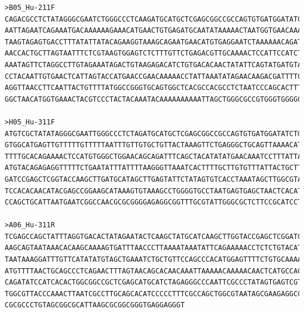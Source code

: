 \begin{verbatim}
>B05_Hu-211F
CAGACGCCTCTATAGGGCGAATCTGGGCCCTCAAGATGCATGCTCGAGCGGCCGCCAGTGTGATGGATATCTGCAGAATTCGCCCTTCAGTGAACGCCAAACAAGTAAGATTAGAATTAC
AATTAGAATCAGAAATGACAAAAAAGAAACATGAACTGTGAGATGCAATATAAAAACTAATGGTGAACAAAGCAAAGAATAAAAAATAAAAACGGAAAGATTAAAAGGAAAATGTGACTG
TAAGTAGAGTGACCTTTATATTATACAGAAGGTAAAGCAGAATGAACATGTGAGGAATCTAAAAAACAGATATAAAATAGAAACAACTGAAGGCTTATATAATTAGTCTATAAAGCTAGG
AACCACTGCTTAGTAATTTCTCGTAAGTGGAGTCTCTTTGTTCTGAGACGTTGCAAAACTCCATTCCATCTCAAAGTTATTTTTAATGTTAAAATTTGTAAGAGTGAGCAACGGTATCCT
AAATAGTTCTAGGCCTTGTAGAAATAGACTGTAAGAGACATCTGTGACACAACTATATTCAGTATGATGTAGGGTCTGTTACAATGGGATGAAGTGAATTTAGATTATTTCAAGACTAAA
CCTACAATTGTGAACTCATTAGTACCATGAACCGAACAAAAACCTATTAAATATAGAACAAGACGATTTTCATGAAAAAATAAATATGAACAAATCAGTATTTTCAGTTGTTTGAAATAT
AGGTTAACCTTCAATTACTGTTTTATGGCCGGGTGCAGTGGCTCACGCCACGCCTCTAATCCCAGCACTTTGGGAGGCCGAGGCAGGCGGATCATGAGGTCAGGAGATCGAGACCATCCT
GGCTAACATGGTGAAACTACGTCCCTACTACAAATACAAAAAAAAAATTAGCTGGGCGCCGTGGGTGGGGCGCCTATAGTCCCAAGCT

>H05_Hu-311F
ATGTCGCTATATAGGGCGAATTGGGCCCTCTAGATGCATGCTCGAGCGGCCGCCAGTGTGATGGATATCTGCAGAATTCGCCCTTGGCCACGCGTCGACTAGTACTTTTTTTTTTCTTTT
GTGGCATGAGTTGTTTTTGTTTTTAATTTGTTGTGCTGTTACTAAAGTTCTGAGGGCTGCAGTTAAAACATTCCAATTTCTCCCTTCCTTCCATCTTTCTTTATTGATTGATTCTCAAGA
TTTTGCACAGAAAACTCCATGTGGGCTGGAACAGCAGATTTCAGCTACATATATGAACAAATCCTTTATTATTATTATAATTATTTTTTGCGTGAAAGTGTTACATATTCTTTCACTTGT
ATGTACAGAGAGGTTTTTCTGAATATTTATTTTAAGGGTTAAATCACTTTTGCTTGTGTTTATTACTGCTTGAGGTTGAGCCAAGGGCGAATTCCAGCACACTGGCGGCCGTTACTAGTG
GATCCGAGCTCGGTACCAAGCTTGATGCATAGCTTGAGTATTCTATAGTGTCACCTAAATAGCTTGGCGTAATCATGGTCATAGCTGTTTCCTGTGTGAAATTGTTATCCGCTCACAAAT
TCCACACAACATACGAGCCGGAAGCATAAAGTGTAAAGCCTGGGGTGCCTAATGAGTGAGCTAACTCACATTAATTGCGTTGCGCTCACTGCCCGCTTTCCAGTCGGGAAACCTGTCGTG
CCAGCTGCATTAATGAATCGGCCAACGCGCGGGGAGAGGCGGTTTGCGTATTGGGCGCTCTTCCGCATCCTCGCTC

>A06_Hu-311R
TCGAGCCAGCTATTTAGGTGACACTATAGAATACTCAAGCTATGCATCAAGCTTGGTACCGAGCTCGGATCCACTAGTAACGGCCGCCAGTGTGCTGGAATTCGCCCTTGGCTCAACCTC
AAGCAGTAATAAACACAAGCAAAAGTGATTTAACCCTTAAAATAAATATTCAGAAAAACCTCTCTGTACATACAAGTGAAAGAATATGTAACACTTTCACGCAAAAAATAATTATAATAA
TAATAAAGGATTTGTTCATATATGTAGCTGAAATCTGCTGTTCCAGCCCACATGGAGTTTTCTGTGCAAAATCTTGAGAATCAATCAATAAAGAAAGATGGAAGGAAGGGAGAAATTGGA
ATGTTTTAACTGCAGCCCTCAGAACTTTAGTAACAGCACAACAAATTAAAAACAAAAACAACTCATGCCACAAAAGAAAAAAAAAAGTACTAGTCGACGCGTGGCCAAGGGCGAATTCTG
CAGATATCCATCACACTGGCGGCCGCTCGAGCATGCATCTAGAGGGCCCAATTCGCCCTATAGTGAGTCGTATTACAATTCACTGGCCGTCGTTTTACAACGTCGTGACTGGGAAAACCC
TGGCGTTACCCAAACTTAATCGCCTTGCAGCACATCCCCCTTTCGCCAGCTGGCGTAATAGCGAAGAGGCCCGCACCGATCGCCCTTCCCAACAGTTGCGCAGCCTGAATGGCGAATGGA
CGCGCCCTGTAGCGGCGCATTAAGCGCGGCGGGTGAGGAGGGT


\end{verbatim}
